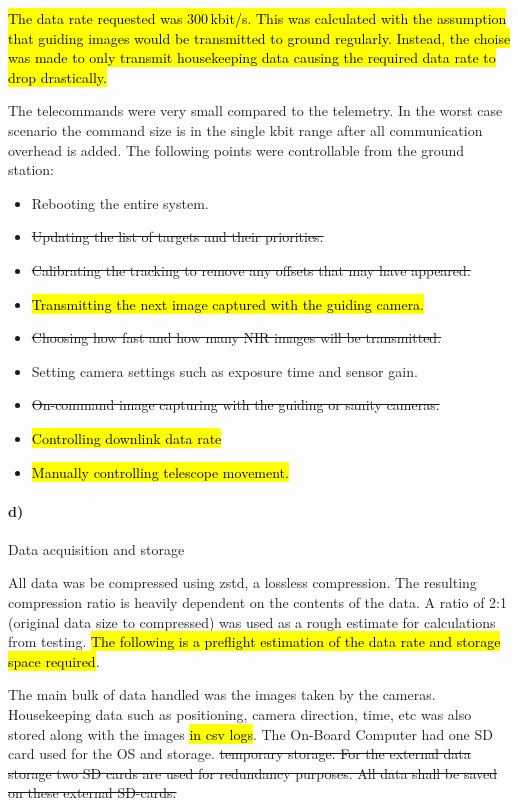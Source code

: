\hl{The data rate requested was 300\,kbit/s. This was calculated with the assumption that guiding images would be transmitted to ground regularly. Instead, the choise was made to only transmit housekeeping data causing the required data rate to drop drastically.}

\newpage
The telecommands were very small compared to the telemetry. In the worst case scenario the command size is in the single kbit range after all communication overhead is added. The following points were controllable from the ground station:

\begin{itemize}
    \item Rebooting the entire system.
    \item \st{Updating the list of targets and their priorities.}
    \item \st{Calibrating the tracking to remove any offsets that may have appeared.}
    \item \hl{Transmitting the next image captured with the guiding camera.}
    \item \st{Choosing how fast and how many NIR images will be transmitted.}
    \item Setting camera settings such as exposure time and sensor gain.
    \item \st{On-command image capturing with the guiding or sanity cameras.}
    \item \hl{Controlling downlink data rate}
    \item \hl{Manually controlling telescope movement.}
\end{itemize}

\paragraph{d)} Data acquisition and storage

All data was be compressed using zstd, a lossless compression. The resulting compression ratio is heavily dependent on the contents of the data. A ratio of 2:1 (original data size to compressed) was used as a rough estimate for calculations from testing. \hl{The following is a preflight estimation of the data rate and storage space required}.

The main bulk of data handled was the images taken by the cameras. Housekeeping data such as positioning, camera direction, time, etc was also stored along with the images \hl{in csv logs}. The On-Board Computer had one SD card used for the OS and storage. \st{temporary storage. For the external data storage two SD cards are used for redundancy purposes. All data shall be saved on these external SD-cards.}

